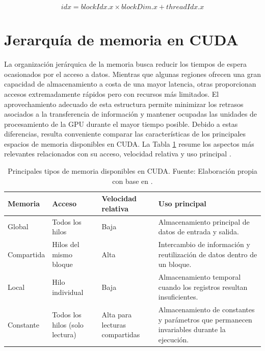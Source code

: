 \begin{equation}
\label{eq:indice_global}
idx = blockIdx.x \times blockDim.x + threadIdx.x
\end{equation}


\section{Jerarquía de memoria en CUDA}

La organización jerárquica de la memoria busca reducir los tiempos de espera ocasionados por el acceso a datos. Mientras que algunas regiones ofrecen una gran capacidad de almacenamiento a costa de una mayor latencia, otras proporcionan accesos extremadamente rápidos pero con recursos más limitados. El aprovechamiento adecuado de esta estructura permite minimizar los retrasos asociados a la transferencia de información y mantener ocupadas las unidades de procesamiento de la GPU durante el mayor tiempo posible. Debido a estas diferencias, resulta conveniente comparar las características de los principales espacios de memoria disponibles en CUDA. La Tabla \ref{tab:memorias_cuda} resume los aspectos más relevantes relacionados con su acceso, velocidad relativa y uso principal \cite{cudaMemoryHierarchy,cornellMemory}.

\begin{table}[H]
\centering
\caption{Principales tipos de memoria disponibles en CUDA. Fuente: Elaboración propia con base en \cite{cudaMemoryHierarchy,nvidiaBestPractices,cornellMemory,nvidiaProgrammingGuide}.}
\label{tab:memorias_cuda}
\begin{tabular}{|p{2.5cm}|p{2.5cm}|p{2.5cm}|p{6cm}|}
\hline
\textbf{Memoria} & \textbf{Acceso} & \textbf{Velocidad relativa} & \textbf{Uso principal} \\
\hline
Global & Todos los hilos & Baja & Almacenamiento principal de datos de entrada y salida. \\
\hline
Compartida & Hilos del mismo bloque & Alta & Intercambio de información y reutilización de datos dentro de un bloque. \\
\hline
Local & Hilo individual & Baja & Almacenamiento temporal cuando los registros resultan insuficientes. \\
\hline
Constante & Todos los hilos (solo lectura) & Alta para lecturas compartidas & Almacenamiento de constantes y parámetros que permanecen invariables durante la ejecución. \\
\hline
\end{tabular}
\end{table}

